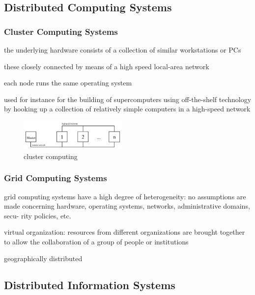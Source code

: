 \documentclass[ngerman,a4paper]{report}
\begin{document}
\subsection{Distributed Computing Systems}

\subsubsection{Cluster Computing Systems}

\begin{compactitem}
\item the underlying hardware consists of a collection of similar workstations or PCs
\item these closely connected by means of a high speed local-area network
\item each node runs the same operating system
\item used for instance for the building of supercomputers using off-the-shelf technology by hooking up a collection of relatively simple computers in a high-speed network
\end{compactitem}

\begin{figure}[h]
	\centering
	\includegraphics[width=200px]{gfx/cluster_computing.png}
	\caption{cluster computing}
	\label{img:cluster_comp}
\end{figure}

\subsubsection{Grid Computing Systems}

\begin{compactitem}
\item grid computing systems have a high degree of heterogeneity: no assumptions are made concerning hardware, operating systems, networks, administrative domains, secu- rity policies, etc.
\item virtual organization: resources from different organizations are brought together to allow the collaboration of a group of people or institutions
\item geographically distributed
\end{compactitem}

\subsection{Distributed Information Systems}
\end{document}
